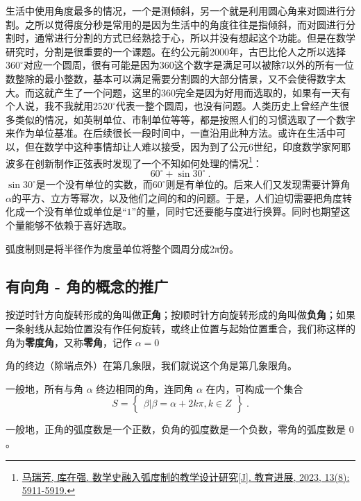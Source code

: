 生活中使用角度最多的情况，一个是测倾斜，另一个就是利用圆心角来对圆进行分割。之所以觉得度分秒是常用的是因为生活中的角度往往是指倾斜，而对圆进行分割时，通常进行分割的方式已经熟捻于心，所以并没有想起这个功能。但是在数学研究时，分割是很重要的一个课题。在约公元前2000年，古巴比伦人之所以选择$360^\circ$对应一个圆周，很有可能是因为360这个数字是满足可以被除7以外的所有一位数整除的最小整数，基本可以满足需要分割圆的大部分情景，又不会使得数字太大。而这就产生了一个问题，这里的360完全是因为好用而选取的，如果有一天有个人说，我不我就用$2520^\circ$代表一整个圆周，也没有问题。人类历史上曾经产生很多类似的情况，如英制单位、市制单位等等，都是按照人们的习惯选取了一个数字来作为单位基准。在后续很长一段时间中，一直沿用此种方法。或许在生活中可以，但在数学中这种事情却让人难以接受，因为到了公元6世纪，印度数学家阿耶波多在创新制作正弦表时发现了一个不知如何处理的情况\footnote{\href{https://www.hanspub.org/journal/PaperInformation?paperID=71063&utm_source=chatgpt.com}{马瑞芳, 库在强. 数学史融入弧度制的教学设计研究[J]. 教育进展, 2023, 13(8): 5911-5919.}}：
\begin{equation}
60^\circ+\sin30^\circ~.
\end{equation}
$\sin30^\circ$是一个没有单位的实数，而$60^\circ$则是有单位的。后来人们又发现需要计算角$\alpha$的平方、立方等幂次，以及他们之间的和的问题。于是，人们迫切需要把角度转化成一个没有单位或单位是“$1$”的量，同时它还要能与度进行换算。同时也期望这个量能够不依赖于喜好选取。

弧度制则是将半径作为度量单位将整个圆周分成2π份。

\subsection{有向角 - 角的概念的推广}


按逆时针方向旋转形成的角叫做\textbf{正角}；按顺时针方向旋转形成的角叫做\textbf{负角}；如果一条射线从起始位置没有作任何旋转，或终止位置与起始位置重合，我们称这样的角为\textbf{零度角}，又称\textbf{零角}，记作 $\alpha = 0$

角的终边（除端点外）在第几象限，我们就说这个角是第几象限角。

一般地，所有与角 $\alpha$ 终边相同的角，连同角 $\alpha$ 在内，可构成一个集合
\begin{equation}
S = \begin{Bmatrix} \beta|\beta=\alpha+2k\pi,k \in Z \end{Bmatrix}~.
\end{equation}


一般地，正角的弧度数是一个正数，负角的弧度数是一个负数，零角的弧度数是 $0$。
